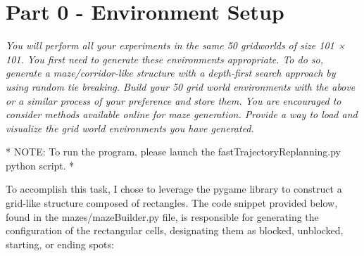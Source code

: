 \graphicspath{{Images/}}

\section{Part 0 - Environment Setup}

\textit{You will perform all your experiments in the same 50 gridworlds of size 101 × 101. You first need to generate these environments appropriate. To do so, generate a maze/corridor-like structure with a depth-first search approach by using random tie breaking. Build your 50 grid world environments with the above or a similar process of your preference and store them. You are encouraged to consider methods available online for maze generation. Provide a way to load and visualize the grid world environments you have generated.}

* NOTE: To run the program, please launch the fastTrajectoryReplanning.py python script. *

To accomplish this task, I chose to leverage the pygame library to construct a grid-like structure composed of rectangles. The code snippet provided below, found in the mazes/mazeBuilder.py file, is responsible for generating the configuration of the rectangular cells, designating them as blocked, unblocked, starting, or ending spots:


